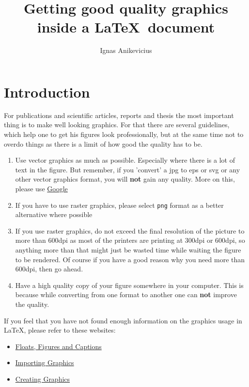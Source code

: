 \documentclass[a4paper,11pt]{article}
\title{Getting good quality graphics inside a \LaTeX\ document}
\author{Ignas Anikevicius}
\begin{document}
\maketitle

\section{Introduction}

For publications and scientific articles, reports and thesis the most important
thing is to make well looking graphics. For that there are several guidelines,
which help one to get his figures look professionally, but at the same time not
to overdo things as there is a limit of how good the quality has to be.

\begin{enumerate}
    \item Use vector graphics as much as possible. Especially where there is a
        lot of text in the figure. But remember, if you 'convert' a jpg to eps
        or svg or any other vector graphics format, you will \textbf{not} gain
        any quality. More on this, please use
        \href{http://www.google.co.uk}{Google}
    \item If you have to use raster graphics, please select \verb|png| format as
        a better alternative where possible
    \item If you use raster graphics, do not exceed the final resolution of the
        picture to more than 600dpi as most of the printers are printing at
        300dpi or 600dpi, so anything more than that might just be wasted time
        while waiting the figure to be rendered. Of course if you have a good
        reason why you need more than 600dpi, then go ahead.
    \item Have a high quality copy of your figure somewhere in your computer.
        This is because while converting from one format to another one can
        \textbf{not} improve the quality.
\end{enumerate}

If you feel that you have not found enough information on the graphics usage in
\LaTeX, please refer to these websites:
\begin{itemize}
    \item
        \href{https://secure.wikimedia.org/wikibooks/en/wiki/LaTeX/Floats,_Figures_and_Captions}{Floats,
        Figures and Captions}
    \item
        \href{https://secure.wikimedia.org/wikibooks/en/wiki/LaTeX/Importing_Graphics}{Importing
        Graphics}
    \item
        \href{https://secure.wikimedia.org/wikibooks/en/wiki/LaTeX/Creating_Graphics}{Creating
        Graphics}
\end{itemize}
\end{document}
